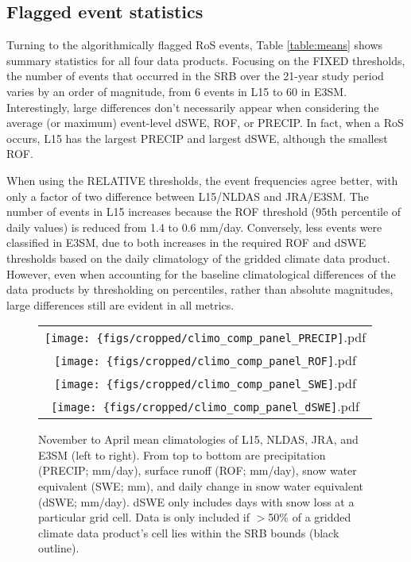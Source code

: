 \documentclass[draft]{agujournal2019}
\begin{document}
\subsection{Flagged event statistics}

Turning to the algorithmically flagged RoS events, Table \ref{table:means} shows summary statistics for all four data products. 
Focusing on the FIXED thresholds, the number of events that occurred in the SRB over the 21-year study period varies by an order of magnitude, from 6 events in L15 to 60 in E3SM.
Interestingly, large differences don't necessarily appear when considering the average (or maximum) event-level dSWE, ROF, or PRECIP. 
In fact, when a RoS occurs, L15 has the largest PRECIP and largest dSWE, although the smallest ROF.

When using the RELATIVE thresholds, the event frequencies agree better, with only a factor of two difference between L15/NLDAS and JRA/E3SM. 
The number of events in L15 increases because the ROF threshold (95th percentile of daily values) is  reduced from 1.4 to 0.6 mm/day. 
Conversely, less events were classified in E3SM, due to both increases in the required ROF and dSWE thresholds based on the daily climatology of the gridded climate data product. 
However, even when accounting for the baseline climatological differences of the data products by thresholding on percentiles, rather than absolute magnitudes, large differences still are evident in all metrics.

\begin{figure}
\begin{tabular}{c}
\texttt{[image: \{figs/cropped/climo\_comp\_panel\_PRECIP]}.pdf} \\
\texttt{[image: \{figs/cropped/climo\_comp\_panel\_ROF]}.pdf} \\
\texttt{[image: \{figs/cropped/climo\_comp\_panel\_SWE]}.pdf} \\
\texttt{[image: \{figs/cropped/climo\_comp\_panel\_dSWE]}.pdf}
\end{tabular}
\caption{November to April mean climatologies of L15, NLDAS, JRA, and E3SM (left to right). From top to bottom are precipitation (PRECIP; mm/day), surface runoff (ROF; mm/day), snow water equivalent (SWE; mm), and daily change in snow water equivalent (dSWE; mm/day). dSWE only includes days with snow loss at a particular grid cell. Data is only included if $>$50\% of a gridded climate data product's cell lies within the SRB bounds (black outline).}
\label{fig:means}
\end{figure}
\end{document}
